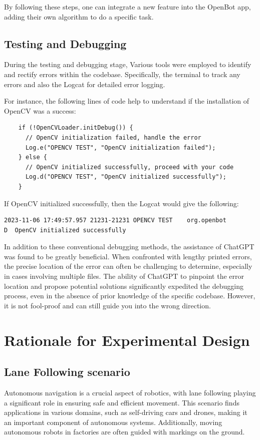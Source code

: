 \documentclass[12pt]{report}
\begin{document}
By following these steps, one can integrate a new feature into the OpenBot app, adding their own algorithm to do a specific task.

\subsection{Testing and Debugging}
\label{sub:Testing_and_debugging}

During the testing and debugging stage, Various tools were employed to identify and rectify errors within the codebase. Specifically, the terminal to track any errors and also the Logcat for detailed error logging.

For instance, the following lines of code help to understand if the installation of OpenCV was a success:
\begin{lstlisting}
    if (!OpenCVLoader.initDebug()) {
      // OpenCV initialization failed, handle the error
      Log.e("OPENCV TEST", "OpenCV initialization failed");
    } else {
      // OpenCV initialized successfully, proceed with your code
      Log.d("OPENCV TEST", "OpenCV initialized successfully");
    }
\end{lstlisting}
If OpenCV initialized successfully, then the Logcat would give the following:
\begin{lstlisting}
2023-11-06 17:49:57.957 21231-21231 OPENCV TEST    org.openbot                          D  OpenCV initialized successfully
\end{lstlisting}


In addition to these conventional debugging methods, the assistance of ChatGPT \cite{bib:chatGPT} was found to be greatly beneficial. When confronted with lengthy printed errors, the precise location of the error can often be challenging to determine, especially in cases involving multiple files. The ability of ChatGPT to pinpoint the error location and propose potential solutions significantly expedited the debugging process, even in the absence of prior knowledge of the specific codebase. However, it is not fool-proof and can still guide you into the wrong direction.




\section{Rationale for Experimental Design}
\subsection{Lane Following scenario}
\label{sub:lane}
Autonomous navigation is a crucial aspect of robotics, with lane following playing a significant role in ensuring safe and efficient movement. This scenario finds applications in various domains, such as self-driving cars and drones, making it an important component of autonomous systems. Additionally, moving autonomous robots in factories are often guided with markings on the ground.
\end{document}
